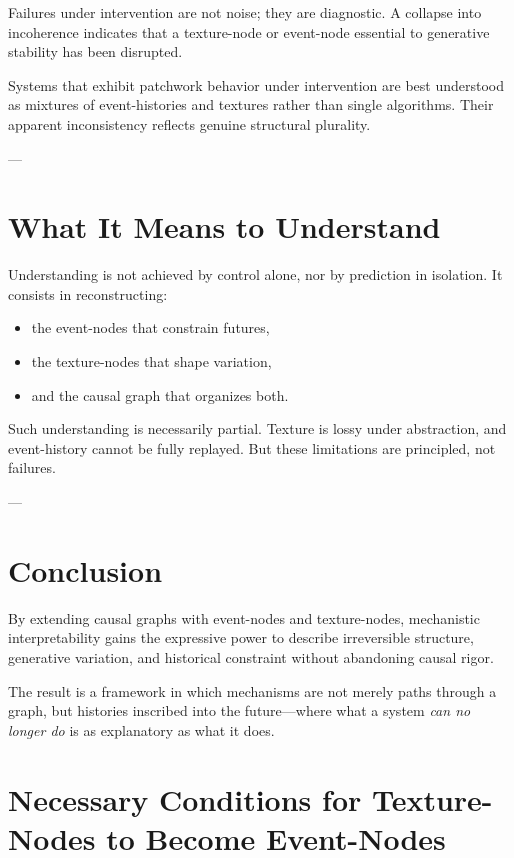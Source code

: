 \documentclass[11pt]{article}
\begin{document}
Failures under intervention are not noise; they are diagnostic. A collapse into incoherence indicates that a texture-node or event-node essential to generative stability has been disrupted.

Systems that exhibit patchwork behavior under intervention are best understood as mixtures of event-histories and textures rather than single algorithms. Their apparent inconsistency reflects genuine structural plurality.

---

\section{What It Means to Understand}

Understanding is not achieved by control alone, nor by prediction in isolation. It consists in reconstructing:
\begin{itemize}
\item the event-nodes that constrain futures,
\item the texture-nodes that shape variation,
\item and the causal graph that organizes both.
\end{itemize}

Such understanding is necessarily partial. Texture is lossy under abstraction, and event-history cannot be fully replayed. But these limitations are principled, not failures.

---

\section{Conclusion}

By extending causal graphs with event-nodes and texture-nodes, mechanistic interpretability gains the expressive power to describe irreversible structure, generative variation, and historical constraint without abandoning causal rigor.

The result is a framework in which mechanisms are not merely paths through a graph, but histories inscribed into the future—where what a system \emph{can no longer do} is as explanatory as what it does.

\section{Necessary Conditions for Texture-Nodes to Become Event-Nodes}
\end{document}

